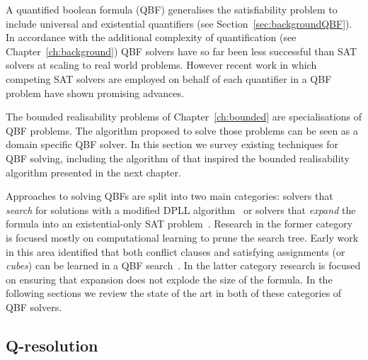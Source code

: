 A quantified boolean formula (QBF) generalises the satisfiability problem to include universal and existential quantifiers (see Section~\ref{sec:backgroundQBF}). In accordance with the additional complexity of quantification (see Chapter~\ref{ch:background}) QBF solvers have so far been less successful than SAT solvers at scaling to real world problems. However recent work in which competing SAT solvers are employed on behalf of each quantifier in a QBF problem have shown promising advances.

The bounded realisability problems of Chapter~\ref{ch:bounded} are specialisations of QBF problems. The algorithm proposed to solve those problems can be seen as a domain specific QBF solver. In this section we survey existing techniques for QBF solving, including the algorithm of \cite{Janota12} that inspired the bounded realisability algorithm presented in the next chapter.

Approaches to solving QBFs are split into two main categories: solvers that \emph{search} for solutions with a modified DPLL algorithm~\cite{Cadoli98} or solvers that \emph{expand} the formula into an existential-only SAT problem~\cite{Ayari02}. Research in the former category is focused mostly on computational learning to prune the search tree. Early work in this area identified that both conflict clauses and satisfying assignments (or \emph{cubes}) can be learned in a QBF search~\cite{Zhang02,Giunchiglia02}. In the latter category research is focused on ensuring that expansion does not explode the size of the formula. In the following sections we review the state of the art in both of these categories of QBF solvers.


\subsection{Q-resolution}

